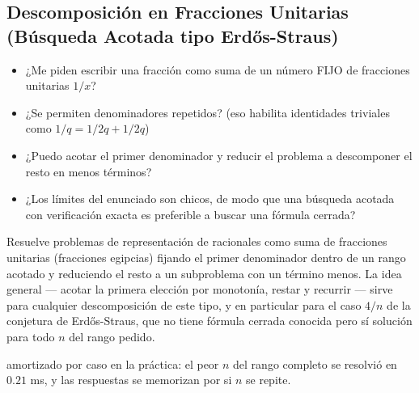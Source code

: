 \subsection{Descomposición en Fracciones Unitarias (Búsqueda Acotada tipo Erdős-Straus)}
\label{alg:7-7}


\begin{itemize}
\item ¿Me piden escribir una fracción como suma de un número FIJO de fracciones unitarias $1/x$?
\item ¿Se permiten denominadores repetidos? (eso habilita identidades triviales como $1/q = 1/2q + 1/2q$)
\item ¿Puedo acotar el primer denominador y reducir el problema a descomponer el resto en menos términos?
\item ¿Los límites del enunciado son chicos, de modo que una búsqueda acotada con verificación exacta es preferible a buscar una fórmula cerrada?
\end{itemize}

 Resuelve problemas de representación de racionales como suma de fracciones unitarias (fracciones egipcias) fijando el primer denominador dentro de un rango acotado y reduciendo el resto a un subproblema con un término menos. La idea general — acotar la primera elección por monotonía, restar y recurrir — sirve para cualquier descomposición de este tipo, y en particular para el caso $4/n$ de la conjetura de Erdős-Straus, que no tiene fórmula cerrada conocida pero sí solución para todo $n$ del rango pedido.

  amortizado por caso en la práctica: el peor $n$ del rango completo se resolvió en $0.21$ ms, y las respuestas se memorizan por si $n$ se repite.

